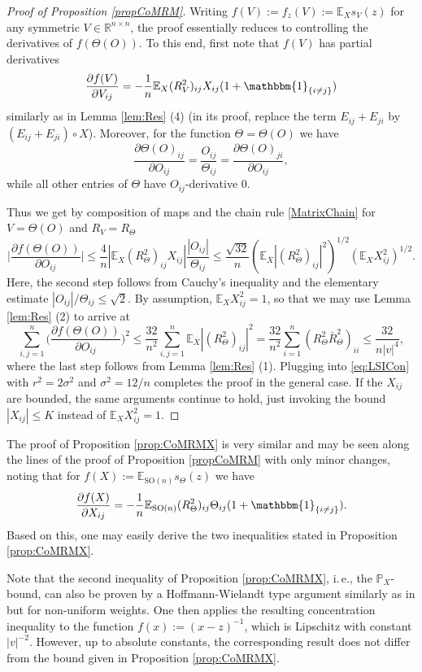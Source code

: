\documentclass[a4paper,12pt]{amsart}
\numberwithin{equation}{section}
\theoremstyle{remark}
\def\E{{\mathbb E}}
\def\P{{\mathbb P}}
\def\R{{\mathbb R}}
\begin{document}
\begin{proof}[Proof of Proposition \ref{propCoMRM}]
Writing $f(V) := f_z(V) := \E_X s_V(z)$ for any symmetric $V \in \R^{n \times n}$, the proof essentially reduces to controlling the derivatives of $f(\Theta(O))$. To this end, first note that $f(V)$ has partial derivatives
\[
\frac{\partial f(V)}{\partial V_{ij}} = - \frac{1}{n}\E_X (R_V^2)_{ij} X_{ij} (1 +\mathbbm{1}_{\{i\ne j\}})
\]
similarly as in Lemma \ref{lem:Res} (4) (in its proof, replace the term $E_{ij} + E_{ji}$ by $(E_{ij} + E_{ji}) \circ X$). Moreover, for the function $\Theta = \Theta(O)$ we have 
\[ 
\frac{\partial \Theta(O)_{ij}}{\partial O_{ij}} = \frac{O_{ij}}{\Theta_{ij}} = \frac{\partial \Theta(O)_{ji}}{\partial O_{ij}},\]
while all other entries of $\Theta$ have $O_{ij}$-derivative $0$.

Thus we get by composition of maps and the chain rule \eqref{MatrixChain} for $V= \Theta(O)$ and $R_V=R_{\Theta}$
\[
\Big|\frac{\partial f(\Theta(O))}{\partial O_{ij}}\Big| \le \frac{4}{n} |\E_X (R_{\Theta}^2)_{ij} X_{ij} | \frac{|O_{ij}|}{\Theta_{ij}}
\le \frac{\sqrt{32}}{n} (\E_X |(R_{\Theta}^2)_{ij}|^2)^{1/2} (\E_X X_{ij}^2)^{1/2}.
\]
Here, the second step follows from Cauchy's inequality and the elementary estimate $|O_{ij}|/\Theta_{ij} \le \sqrt{2}$. By assumption, $\E_X X_{ij}^2=1$, so that we may use Lemma \ref{lem:Res} (2) to arrive at
\[
	\sum_{i,j=1}^n \Big(\frac{\partial f(\Theta(O))}{\partial O_{ij}}\Big)^2 \le \frac{32}{n^2} \sum_{i,j=1}^n \E_X |(R_{\Theta}^2)_{ij}|^2 = \frac{32}{n^2} \sum_{i=1}^n (R_{\Theta}^2\bar{R}_{\Theta}^2)_{ii} \le \frac{32}{n |v|^4},
\]
where the last step follows from Lemma \ref{lem:Res} (1). Plugging into \eqref{eq:LSICon} with $r^2=2\sigma^2$ and $\sigma^2 = 12/n$ completes the proof in the general case. If the $X_{ij}$ are bounded, the same arguments continue to hold, just invoking the bound $|X_{ij}| \le K$ instead of $\E_X X_{ij}^2=1$.
\end{proof}

The proof of Proposition \ref{prop:CoMRMX} is very similar and may be seen along the lines of the proof of Proposition \ref{propCoMRM} with only minor changes, noting that for $f(X) := \E_{\mathrm{SO}(n)} s_\Theta(z)$ we have
\[
\frac{\partial f(X)}{\partial X_{ij}} = - \frac{1}{n}\E_{\mathrm{SO}(n)} (R_\Theta^2)_{ij} \Theta_{ij} (1 +\mathbbm{1}_{\{i\ne j\}}).
\]
Based on this, one may easily derive the two inequalities stated in Proposition \ref{prop:CoMRMX}.

Note that the second inequality of Proposition \ref{prop:CoMRMX}, i.\,e., the $\P_X$-bound, can also be proven by a Hoffmann-Wielandt type argument similarly as in \cite[Th.\ 2.3.5]{AGZ10} but for non-uniform weights. One then applies the resulting concentration inequality to the function $f(x) := (x-z)^{-1}$, which is Lipschitz with constant $|v|^{-2}$. However, up to absolute constants, the corresponding result does not differ from the bound given in Proposition \ref{prop:CoMRMX}.
\end{document}
